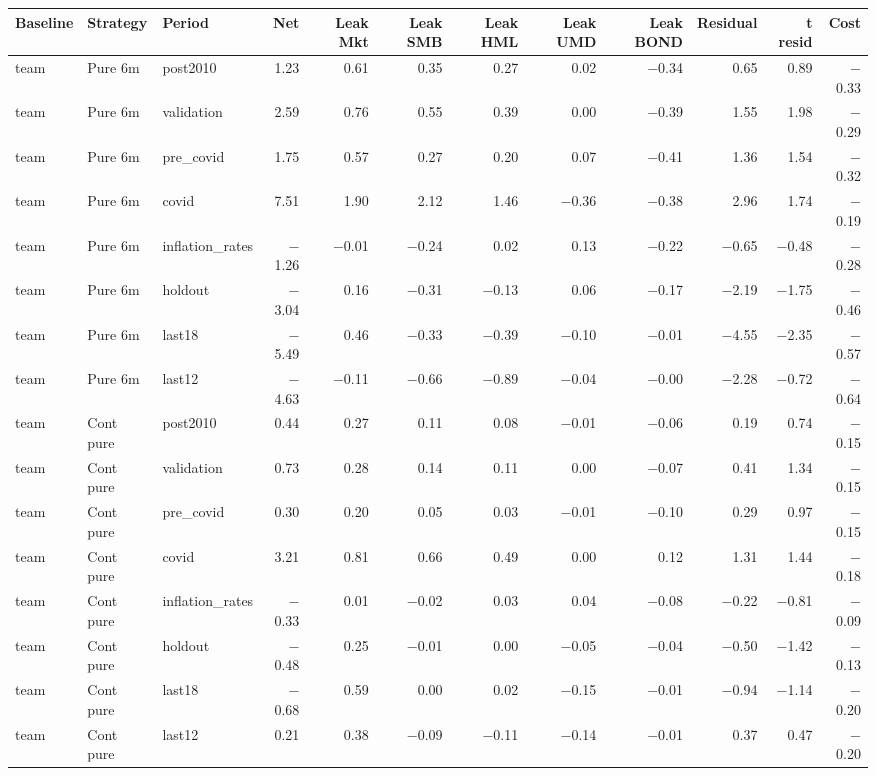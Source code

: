 \begin{tabular}{lllrrrrrrrrr}
\toprule
Baseline & Strategy & Period & Net & Leak Mkt & Leak SMB & Leak HML & Leak UMD & Leak BOND & Residual & t resid & Cost \\
\midrule
team & Pure 6m & post2010 & 1.23 & 0.61 & 0.35 & 0.27 & 0.02 & $-$0.34 & 0.65 & 0.89 & $-$0.33 \\
team & Pure 6m & validation & 2.59 & 0.76 & 0.55 & 0.39 & 0.00 & $-$0.39 & 1.55 & 1.98 & $-$0.29 \\
team & Pure 6m & pre\_covid & 1.75 & 0.57 & 0.27 & 0.20 & 0.07 & $-$0.41 & 1.36 & 1.54 & $-$0.32 \\
team & Pure 6m & covid & 7.51 & 1.90 & 2.12 & 1.46 & $-$0.36 & $-$0.38 & 2.96 & 1.74 & $-$0.19 \\
team & Pure 6m & inflation\_rates & $-$1.26 & $-$0.01 & $-$0.24 & 0.02 & 0.13 & $-$0.22 & $-$0.65 & $-$0.48 & $-$0.28 \\
team & Pure 6m & holdout & $-$3.04 & 0.16 & $-$0.31 & $-$0.13 & 0.06 & $-$0.17 & $-$2.19 & $-$1.75 & $-$0.46 \\
team & Pure 6m & last18 & $-$5.49 & 0.46 & $-$0.33 & $-$0.39 & $-$0.10 & $-$0.01 & $-$4.55 & $-$2.35 & $-$0.57 \\
team & Pure 6m & last12 & $-$4.63 & $-$0.11 & $-$0.66 & $-$0.89 & $-$0.04 & $-$0.00 & $-$2.28 & $-$0.72 & $-$0.64 \\
team & Cont pure & post2010 & 0.44 & 0.27 & 0.11 & 0.08 & $-$0.01 & $-$0.06 & 0.19 & 0.74 & $-$0.15 \\
team & Cont pure & validation & 0.73 & 0.28 & 0.14 & 0.11 & 0.00 & $-$0.07 & 0.41 & 1.34 & $-$0.15 \\
team & Cont pure & pre\_covid & 0.30 & 0.20 & 0.05 & 0.03 & $-$0.01 & $-$0.10 & 0.29 & 0.97 & $-$0.15 \\
team & Cont pure & covid & 3.21 & 0.81 & 0.66 & 0.49 & 0.00 & 0.12 & 1.31 & 1.44 & $-$0.18 \\
team & Cont pure & inflation\_rates & $-$0.33 & 0.01 & $-$0.02 & 0.03 & 0.04 & $-$0.08 & $-$0.22 & $-$0.81 & $-$0.09 \\
team & Cont pure & holdout & $-$0.48 & 0.25 & $-$0.01 & 0.00 & $-$0.05 & $-$0.04 & $-$0.50 & $-$1.42 & $-$0.13 \\
team & Cont pure & last18 & $-$0.68 & 0.59 & 0.00 & 0.02 & $-$0.15 & $-$0.01 & $-$0.94 & $-$1.14 & $-$0.20 \\
team & Cont pure & last12 & 0.21 & 0.38 & $-$0.09 & $-$0.11 & $-$0.14 & $-$0.01 & 0.37 & 0.47 & $-$0.20 \\

\end{tabular}
